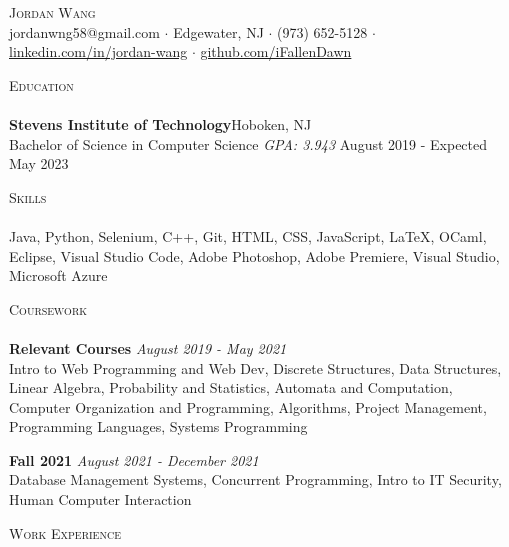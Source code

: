 \documentclass[10pt]{article}
\newcommand{\lineunder} {
    \vspace*{-8pt} \\
    \hspace*{-18pt} \hrulefill \\
}
\newcommand{\header} [1] {
    {\hspace*{-18pt}\vspace*{6pt} \textsc{#1}}
    \vspace*{-6pt} \lineunder
}
\begin{document}
\vspace*{-40pt}

    

\vspace*{2pt}
\begin{center}
	{\Huge \scshape {Jordan Wang}}\\
	jordanwng58@gmail.com $\cdot$ Edgewater, NJ $\cdot$ (973) 652-5128 $\cdot$ \href{https://www.linkedin.com/in/jordan-wang/}{linkedin.com/in/jordan-wang} $\cdot$ \href{https://github.com/iFallenDawn}{github.com/iFallenDawn} \\
\end{center}

\header{Education}
\textbf{Stevens Institute of Technology}\hfill Hoboken, NJ\\
Bachelor of Science in Computer Science \textit{GPA: 3.943} \hfill August 2019 - Expected May 2023\\
\vspace{2mm}

\header{Skills}
	Java, Python, Selenium, C++, Git, HTML, CSS, JavaScript, \LaTeX, OCaml, Eclipse, Visual Studio Code, Adobe Photoshop, Adobe Premiere, Visual Studio, Microsoft Azure                    \\
\vspace{2mm}

\header{Coursework}
{\textbf{Relevant Courses}} {\sl August 2019 - May 2021} \hfill 
\\
Intro to Web Programming and Web Dev, Discrete Structures, Data Structures, Linear Algebra, Probability and Statistics, Automata and Computation, Computer Organization and Programming, Algorithms, Project Management, Programming Languages, Systems Programming\\
\vspace*{2mm}

{\textbf{Fall 2021}} {\sl August 2021 - December 2021} \hfill 
\\
Database Management Systems, Concurrent Programming, Intro to IT Security, Human Computer Interaction\\
\vspace*{2mm}

\header{Work Experience}
\vspace{1mm}
\end{document}
